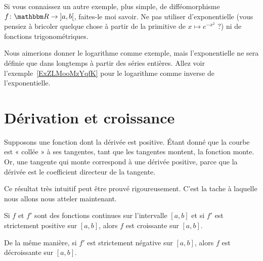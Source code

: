 \begin{probleme}
Si vous connaissez un autre exemple, plus simple, de difféomorphisme \( f\colon \eR\to \mathopen] a , b \mathclose[\), faites-le moi savoir. Ne pas utiliser d'exponentielle (vous pensiez à bricoler quelque chose à partir de la primitive de \( x\mapsto  e^{-x^2}\) ?) ni de fonctions trigonométriques.
\end{probleme}

\begin{example}
    Nous aimerions donner le logarithme comme exemple, mais l'exponentielle ne sera définie que dans longtemps à partir des séries entières. Allez voir l'exemple~\ref{ExZLMooMzYqfK} pour le logarithme comme inverse de l'exponentielle.
\end{example}

\section{Dérivation et croissance}

Supposons une fonction dont la dérivée est positive. Étant donné que la courbe est « collée » à ses tangentes, tant que les tangentes montent, la fonction monte. Or, une tangente qui monte correspond à une dérivée positive, parce que la dérivée est le coefficient directeur de la tangente.

Ce résultat très intuitif peut être prouvé rigoureusement. C'est la tache à laquelle nous allons nous atteler maintenant.

\begin{proposition} \label{PropGFkZMwD}
    Si $f$ et $f'$ sont des fonctions continues sur l'intervalle $[a,b]$ et si $f'$ est strictement positive sur $[a,b]$, alors $f$ est croissante sur $[a,b]$.

    De la même manière, si $f'$ est strictement négative sur $[a,b]$, alors $f$ est décroissante sur $[a,b]$.
\end{proposition}

